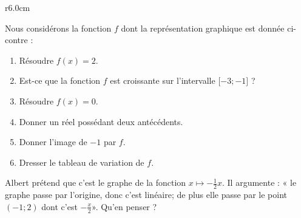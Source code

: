 
\begin{exercice}\label{exosmath-0566}

\begin{wrapfigure}{r}{6.0cm}
   \vspace{-1cm}        %
   \centering
   
\end{wrapfigure}

    Nous considérons la fonction \( f\) dont la représentation graphique est donnée ci-contre :

    \begin{enumerate}
        \item
            Résoudre \( f(x)=2\).
        \item
            Est-ce que la fonction \( f\) est croissante sur l'intervalle \( \mathopen[ -3 ;-1 \mathclose]\) ?
        \item
            Résoudre \( f(x)=0\).
        \item
            Donner un réel possédant deux antécédents.
        \item 
            Donner l'image de \( -1\) par \( f\).
        \item
            Dresser le tableau de variation de \( f\).
    \end{enumerate}
        Albert prétend que c'est le graphe de la fonction \( x\mapsto -\frac{ 1 }{2}x\). Il argumente : « le graphe passe par l'origine, donc c'est linéaire; de plus elle passe par le point \( (-1;2)\) dont c'est \( -\frac{ x }{2}\)». Qu'en penser ?

\end{exercice}
